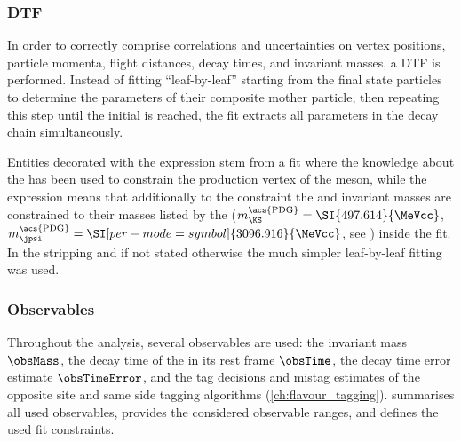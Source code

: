 \subsubsection{\Acl*{DTF}}
\label{sec:measurement_of_sin2beta:data_preparation:dtf}

In order to correctly comprise correlations and uncertainties on vertex
positions, particle momenta, flight distances, decay times, and invariant
masses, a \acf{DTF} \cite{Hulsbergen:2005pu} is performed. Instead of fitting
\enquote{leaf-by-leaf} starting from the final state particles to determine the
parameters of their composite mother particle, then repeating this step until
the initial \bhadron is reached, the \DTF fit extracts all parameters in the
decay chain simultaneously.

Entities decorated with the expression \dtfpv stem from a \DTF fit where the
knowledge about the \PV has been used to constrain the production
vertex of the \Bd meson, while the expression \dtf means that additionally to
the \PV constraint the \jpsi and \KS invariant masses are constrained to their
masses listed by the \PDG ($m_{\KS}^{\text{\acs{PDG}}}=\SI{497.614}{\MeVcc}$,
$m_{\jpsi}^{\text{\acs{PDG}}} = \SI[per-mode=symbol]{3096.916}{\MeVcc}$, see
\cite{Agashe:2014kda}) inside the \DTF fit. In the stripping and if not stated
otherwise the much simpler leaf-by-leaf fitting was used.

\subsubsection{Observables}
\label{sec:measurement_of_sin2beta:data_preparation:observables}

Throughout the analysis, several observables are used: the \Bd invariant mass
$\obsMass$, the decay time of the \Bd in its rest frame $\obsTime$, the \Bd
decay time error estimate $\obsTimeError$, and the tag decisions
\obsTagOSSS and mistag estimates \obsEtaOSSS of the opposite site and same side
tagging algorithms (\cf \cref{ch:flavour_tagging}).
 summarises all
used observables, provides the considered observable ranges, and defines the
used fit constraints.

